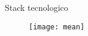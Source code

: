 \begin{tframe}{Stack tecnologico}
\begin{figure}[h]
\centering
\texttt{[image: mean]}
\end{figure}
\end{tframe}